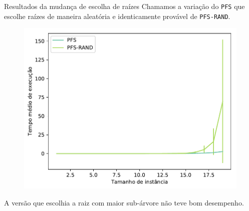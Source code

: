 \documentclass{beamer}
\newcommand{\algname}[1]{\texttt{#1}}
\begin{document}
\begin{frame}{Resultados da mudança de escolha de raízes}
Chamamos a variação do \algname{PFS} que escolhe raízes de maneira 
aleatória e identicamente provável de \algname{PFS-RAND}.

\pause

\begin{figure}[ht]
\includegraphics[clip=true, width=.5\textwidth]{pfs/pfs_rand_avg_time.pdf}
\end{figure}

\pause

A versão que escolhia a raiz com maior sub-árvore não teve bom 
desempenho.
\end{frame}
\end{document}
